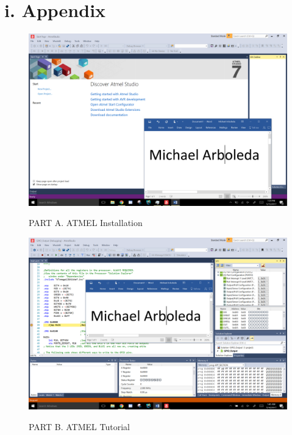 \documentclass[11pt]{article}
\theoremstyle{plain}
\theoremstyle{definition}
\begin{document}
\section*{i. Appendix}
\begin{figure}[H]
	\centering
	\includegraphics[width=\textwidth]{prelabA}
	\label{fig:PLA}
	\caption{PART A. ATMEL Installation}
\end{figure}

\begin{figure}[H]
	\centering
	\includegraphics[width=\textwidth]{prelabB}
	\label{fig:PLB}
	\caption{PART B. ATMEL Tutorial}
\end{figure}
\end{document}

